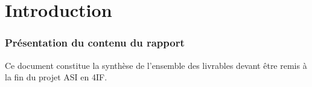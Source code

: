 







\tableofcontents
\listoftodos
\newpage

\part{Introduction}
\label{part:introduction}

\section{Présentation du contenu du rapport}
\label{sec:presentation-du-contenu-du-rapport}

Ce document constitue la synthèse de l'ensemble des livrables devant être remis à la fin du projet ASI en 4IF.  








